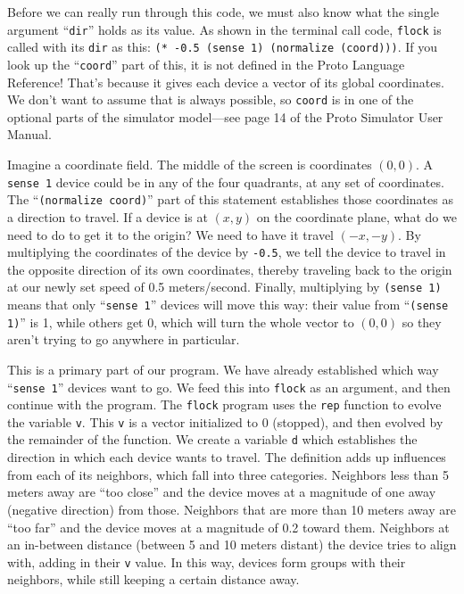 \documentclass{article}
\newcommand\var[1]{{\tt #1}}
\newcommand\qvar[1]{``{\tt #1}''}
\begin{document}
Before we can really run through this code, we must also know what the
single argument \qvar{dir} holds as its value.  As shown in the
terminal call code, \var{flock} is called with its \var{dir} as this:
\var{(* -0.5 (sense 1) (normalize (coord)))}.  If you look up the
\qvar{coord} part of this, it is not defined in the Proto Language
Reference!  That's because it gives each device a vector of its global
coordinates.  We don't want to assume that is always possible, so
\var{coord} is in one of the optional parts of the simulator
model---see page 14 of the Proto Simulator User Manual.

Imagine a coordinate field.  The middle of the screen is coordinates
$(0, 0)$. A \var{sense 1} device could be in any of the four
quadrants, at any set of coordinates.  The \qvar{(normalize coord)}
part of this statement establishes those coordinates as a direction to
travel.  If a device is at $(x, y)$ on the coordinate plane, what do
we need to do to get it to the origin?  We need to have it travel
$(-x, -y)$.  By multiplying the coordinates of the device by
\var{-0.5}, we tell the device to travel in the opposite direction of
its own coordinates, thereby traveling back to the origin at our newly
set speed of 0.5 meters/second.  Finally, multiplying by \var{(sense
  1)} means that only \qvar{sense 1} devices will move this way: their
value from \qvar{(sense 1)} is 1, while others get 0, which will turn
the whole vector to $(0, 0)$ so they aren't trying to go anywhere in
particular.

This is a primary part of our program.  We have already established
which way \qvar{sense 1} devices want to go.  We feed this into
\var{flock} as an argument, and then continue with the program.  The
\var{flock} program uses the \var{rep} function to evolve the variable
\var{v}. This \var{v} is a vector initialized to 0 (stopped), and then
evolved by the remainder of the function.  We create a variable
\var{d} which establishes the direction in which each device wants to
travel.  The definition adds up influences from each of its neighbors,
which fall into three categories.  Neighbors less than 5 meters away
are ``too close'' and the device moves at a magnitude of one away
(negative direction) from those.  Neighbors that are more than 10
meters away are ``too far'' and the device moves at a magnitude of 0.2
toward them.  Neighbors at an in-between distance (between 5 and 10
meters distant) the device tries to align with, adding in their
\var{v} value.  In this way, devices form groups with their neighbors,
while still keeping a certain distance away.
\end{document}
